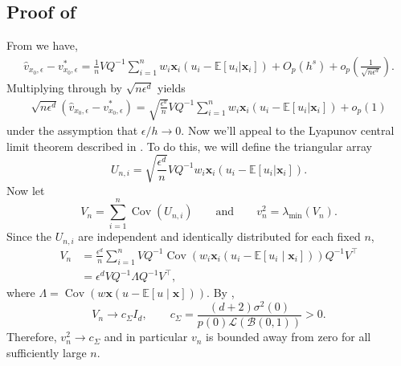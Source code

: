 \documentclass[11pt]{article}
\begin{document}
\begin{appendices}
\subsection{Proof of } \label{sec: proof of central limit for v}
From  we have, 
\begin{align*}
    \hat{v}_{x_0, \epsilon} - v^*_{x_0, \epsilon} = \frac{1}{n}VQ^{-1}\sum_{i = 1}^nw_i\boldsymbol{x}_i(u_i - \mathbb{E}[u_i|\boldsymbol{x}_i])
    + O_p\left(h^s\right) + o_p\left(\frac{1}{\sqrt{n\epsilon^d}}\right).
\end{align*}
Multiplying through by $\sqrt{n\epsilon^{d}}$ yields
\begin{align*}
    \sqrt{n\epsilon^{d}}(\hat{v}_{x_0, \epsilon} - v^*_{x_0, \epsilon}) = \sqrt{\frac{\epsilon^{d}}{n}}VQ^{-1}\sum_{i = 1}^nw_i\boldsymbol{x}_i(u_i - \mathbb{E}[u_i|\boldsymbol{x}_i])
    + o_p\left(1\right)
\end{align*}
under the assymption that $\epsilon/h \to 0.$ Now we'll appeal to the Lyapunov central limit theorem described in . To do this, we will define the triangular array
\[U_{n, i} = \sqrt{\frac{\epsilon^{d}}{n}}VQ^{-1}w_i\boldsymbol{x}_i(u_i - \mathbb{E}[u_i|\boldsymbol{x}_i]).\]
Now let
\[
    V_n = \sum_{i=1}^n\operatorname{Cov}(U_{n,i})
    \qquad\text{and}\qquad
    v_n^2 = \lambda_{\min}(V_n).
\]
Since the $U_{n,i}$ are independent and identically distributed for each fixed $n$,
\begin{align*}
    V_n
    &= \frac{\epsilon^d}{n}\sum_{i=1}^n
    VQ^{-1}\operatorname{Cov}\left(w_i\boldsymbol{x}_i(u_i-\mathbb{E}[u_i\mid \boldsymbol{x}_i])\right)Q^{-1}V^\top \\
    &= \epsilon^dVQ^{-1}\Lambda Q^{-1}V^\top,
\end{align*}
where $\Lambda=\operatorname{Cov}(w\boldsymbol{x}(u-\mathbb{E}[u\mid \boldsymbol{x}]))$. By ,
\[
    V_n \rightarrow c_{\Sigma}I_d,
    \qquad
    c_{\Sigma}
    =
    \frac{(d+2)\sigma^2(0)}
    {p(0)\mathcal{L}(\mathcal{B}(0,1))}
    >0.
\]
Therefore, $v_n^2\rightarrow c_{\Sigma}$ and in particular $v_n$ is bounded away from zero for all sufficiently large $n$.


\end{appendices}
\end{document}
